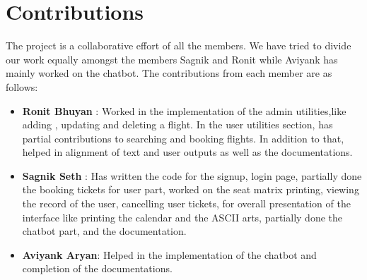\documentclass[a4paper]{scrartcl}
\begin{document}
\section{Contributions}
The project is a collaborative effort of all the members. We have tried to divide our work equally amongst the members Sagnik and Ronit while Aviyank has mainly worked on the chatbot. 
The contributions from each member are as follows:

\begin{itemize}
    \item \textbf{Ronit Bhuyan} : Worked in the implementation of the admin utilities,like adding , updating and deleting a flight. In the user utilities section, has partial contributions to searching and booking flights. In addition to that, helped in alignment of text and user outputs as well as the documentations.
    
    \item \textbf{Sagnik Seth} : Has written the code for the signup, login page, partially done the booking tickets for user part, worked on the seat matrix printing, viewing the record of the user, cancelling user tickets, for overall presentation of the interface like printing the calendar and the ASCII arts, partially done the chatbot part, and the documentation.
    
    \item \textbf{Aviyank Aryan}: Helped in the implementation of the chatbot and  completion of the documentations.
\end{itemize}
\end{document}
